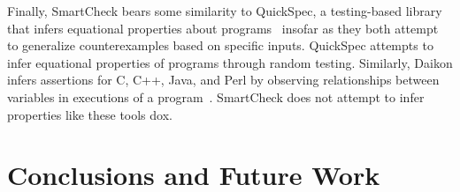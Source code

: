 \documentclass{sigplanconf}
\newcommand{\ttp}[1]{\texttt{#1}}
\begin{document}


Finally, SmartCheck bears some similarity to QuickSpec, a testing-based library
that infers equational properties about programs~\cite{qs} insofar as they both
attempt to generalize counterexamples based on specific inputs.  QuickSpec
attempts to infer equational properties of programs through random testing.
Similarly, Daikon infers assertions for C, C++, Java, and Perl by observing
relationships between variables in executions of a program~\cite{daikon}.
SmartCheck does not attempt to infer properties like these tools dox.



\section{Conclusions and Future Work}\label{sec:conclusions}
\end{document}
